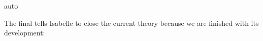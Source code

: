 \begin{isabellebody}
\isamarkupfalse%
{\isacharparenleft}auto{\isacharparenright}\isanewline
{}\isamarkupfalse%
%
\endisatagproof
{\isafoldproof}%
%
\isadelimproof
%
\endisadelimproof
%
\begin{isamarkuptext}%
\noindent
The final  tells Isabelle to close the current theory because
we are finished with its development:%
%
\end{isamarkuptext}%
\isamarkuptrue%
%
\isadelimtheory
%
\endisadelimtheory
%
\isatagtheory
{}\isamarkupfalse%
%
\endisatagtheory
{\isafoldtheory}%
%
\isadelimtheory
%
\endisadelimtheory
\isanewline
\end{isabellebody}%
